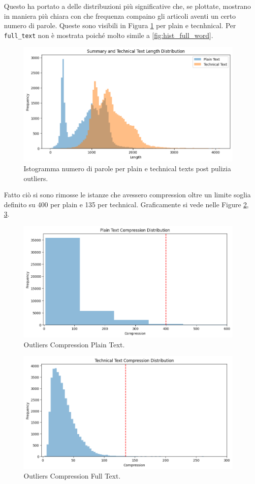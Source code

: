 \documentclass[12pt,a4paper,twoside,openright]{book}
\begin{document}
Questo ha portato a delle distribuzioni più significative che, se plottate, mostrano in maniera più chiara con che frequenza compaino gli articoli aventi un certo numero di parole. Queste sono visibili in Figura \ref{fig:updated_hist_wc} per plain e tecnhnical. Per \texttt{full\_text} non è mostrata poiché molto simile a \ref{fig:hist_full_word}.

\begin{figure}
    \centering
    \includegraphics[width=0.75\linewidth]{images/updated_hist_wc.png}
    \caption{Istogramma numero di parole per plain e technical texts post pulizia outliers.}
    \label{fig:updated_hist_wc}
\end{figure}


Fatto ciò si sono rimosse le istanze che avessero compression oltre un limite soglia definito su 400 per plain e 135 per technical. Graficamente si vede nelle Figure \ref{fig:hist_compression_plain}, \ref{fig:hist_compression_tech}.

\begin{figure}
    \centering
    \includegraphics[width=0.75\linewidth]{images/hist_compression_plain.png}
    \caption{Outliers Compression Plain Text.}
    \label{fig:hist_compression_plain}
\end{figure}

\begin{figure}
    \centering
    \includegraphics[width=0.75\linewidth]{images/hist_compression_technical.png}
    \caption{Outliers Compression Full Text.}
    \label{fig:hist_compression_tech}
\end{figure}
\end{document}
